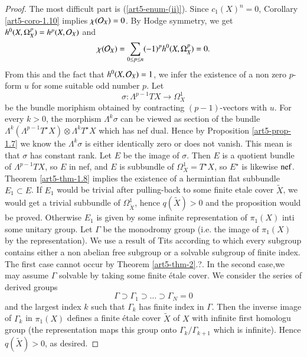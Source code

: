 \begin{proof}
The most difficult part is (\ref{art5-enum-(ii)}). Since $c_{1}(X)^{n} =0$, Corollary \ref{art5-coro-1.10} implies $_{}\chi(\mathcal{O}_{X}) = 0$. By Hodge symmetry, we get $h^{0}(X, \Omega_{X}^{p}) = h^{p}(X, \mathcal{O}_{X})$ and
$$
_{}\chi(\mathcal{O}_{X}) = \sum\limits_{0 \leq p \leq n} (-1)^{p}h^{0}(X, \Omega_{X}^{p}) = 0.
$$
From this and the fact that $h^{0}(X, \mathcal{O}_{X}) =1$, we infer the existence of a non zero $p$-form $u$ for some suitable odd number $p$. Let
$$
\sigma : \Lambda^{p-1}TX \rightarrow \Omega_{X}^{1} 
$$
be the bundle moriphism obtained by contracting $(p-1)$-vectors with $u$. For every $k > 0$, the morphism $\Lambda^{k}\sigma$
can be viewed as section of the bundle $\Lambda^{k}(\Lambda^{p-1}T^{\star}X)\otimes \Lambda^{k}T^{\star}X$ which has nef dual. Hence by Proposition \ref{art5-prop-1.7} we know the $\Lambda^{k}\sigma$ is either identically zero or does not vanish. This mean is that $\sigma$ has constant rank. Let $E$ be the image of $\sigma$. Then $E$ is a quotient bundle of $\Lambda^{p-1}TX$, so $E$ in nef, and $E$ is subbundle of $\Omega_{X}^{1} = T^{\star}X$, so $E^{\star}$ is likewise $\operatorname{nef}$.
Theorem \ref{art5-thm-1.8} implies the existence of a hermintian flat subbundle $E_{1} \subset E$. If $E_{1}$ would be trivial after pulling-back to some finite  etale cover $\widetilde{X}$, we would get a trivial subbundle of $\Omega_{\widetilde{X}}^{1}$, hence $q(\widetilde{X}) > 0$ and the proposition would be proved. Otherwise $E_{1}$ is given by some infinite representation of $\pi_{1}(X)$ inti some unitary group. Let $\Gamma$ be the monodromy group (i.e. the image of $\pi_{1}(X)$ by the representation). We use a result of Tits \cite{art5-keyTi72} according to which every subgroup contains either a non abelian free subgroup or a solvable subgroup of finite index. The first case cannot occur by Theorem \ref{art5-thm-2}.?. In the second case,we may assume $\Gamma$ solvable by taking some finite \'etale cover. We consider the series of derived groups
$$
\Gamma \supset \Gamma_{1} \supset \ldots \supset \Gamma_{N} = {0}
$$
and the largest index $k$ such that $\Gamma_{k}$ has finite index in $\Gamma$. Then the inverse image of $\Gamma_{k}$ in $\pi_{1}(X)$ defines a finite \'etale cover $\widetilde{X}$ of $X$  with infinite first homologu group (the representation maps this group onto $\Gamma_{k}/\Gamma_{k+1}$ which is infinite). Hence $q(\widetilde{X}) > 0$, as desired.
\end{proof}

